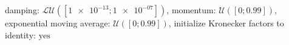 damping: $\mathcal{LU}([\num[scientific-notation=true]{1e-13}; \num[scientific-notation=true]{1e-07}])$, momentum: $\mathcal{U}([\num[scientific-notation=false]{0}; \num[scientific-notation=true]{0.99}])$, exponential moving average: $\mathcal{U}([\num[scientific-notation=false]{0}; \num[scientific-notation=true]{0.99}])$, initialize Kronecker factors to identity: $\text{yes}$